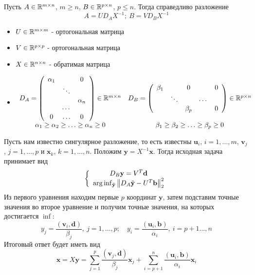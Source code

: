 \begin{statement}
  Пусть $A\in\mathbb{R}^{m\times n}$, $m\geq n$, $B\in\mathbb{R}^{p\times n}$, $p\leq n$.
  Тогда справедливо разложение
  \[A=UD_AX^{-1};\ B=VD_BX^{-1}\]
  \begin{itemize}
    \item $U\in\mathbb{R}^{m\times m}$ - ортогональная матрица
    \item $V\in\mathbb{R}^{p\times p}$ - ортогональная матрица
    \item $X\in\mathbb{R}^{n\times n}$ - обратимая матрица
    \item \[\begin{array}{cc}
              D_A=\left(\begin{array}{ccc}
                  \alpha_1 &        & 0        \\
                           & \ddots &          \\
                           &        & \alpha_n \\
                           & \cdots &          \\
                  0        & \ldots & 0
                \end{array}\right)\in\mathbb{R}^{m\times n} & D_B=\left(\begin{array}{ccccc}
                  \beta_1 &        & 0       &        & 0 \\
                          & \ddots &         & \cdots &   \\
                          &        & \beta_p &        & 0 \\
                \end{array}\right)\in\mathbb{R}^{p\times n} \\
              \alpha_1\geq\alpha_2\geq\ldots\geq\alpha_n\geq0              &
              \beta_1\geq\beta_2\geq\ldots\geq\beta_p\geq0
            \end{array}\]
  \end{itemize}
\end{statement}
Пусть нам известно сингулярное разложение, то есть известны $\mathbf{u}_i$, $i=1,\ldots,m$,
$\mathbf{v}_j$, $j=1,\ldots,p$ и $\mathbf{x}_k$, $k=1,\ldots,n$.
Положим $\mathbf{y}=X^{-1}\mathbf{x}$. Тогда исходная задача принимает вид
\[\left\{\begin{array}{c}
    D_B\mathbf{y}=V^T\mathbf{d}                                                   \\
    \arg{\inf_{\tilde{\mathbf{y}}}\left\lVert D_A\tilde{\mathbf{y}}-U^T\mathbf{b}\right\rVert^2_2} \\
  \end{array}\right.\]
Из первого уравнения находим первые $p$ координат $\mathbf{y}$, затем
подставим точные значения во второе уравнение и получим
точные значения, на которых достигается $\inf$:
\[y_j=\frac{(\mathbf{v}_i,\mathbf{d})}{\beta_j},\ j=1,\ldots,p;\quad y_i=\frac{(\mathbf{u}_i,\mathbf{b})}{\alpha_i},\ i=p+1\ldots,n\]
Итоговый ответ будет иметь вид
\[\mathbf{x}=X\mathbf{y}=\sum_{j=1}^{p}\frac{(\mathbf{v}_j,\mathbf{d})}{\beta_j}\mathbf{x}_j+\sum_{i=p+1}^{n}\frac{(\mathbf{u}_i,\mathbf{b})}{\alpha_i}\mathbf{x}_i\]

